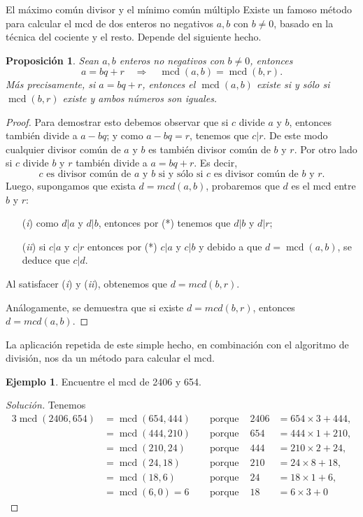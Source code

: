 \documentclass[11pt,spanish,makeidx]{amsbook}
\newtheorem{proposicion}[teorema]{Proposici\'on}
\theoremstyle{definition}
\newtheorem{ejemplo}{Ejemplo}[section]
\theoremstyle{remark}
\newcommand \mcd{\operatorname{mcd}}
\begin{document}
\begin{section}{El máximo común divisor y el mínimo común múltiplo}
Existe un famoso método para calcular el mcd de dos enteros no negativos $a,b$ con $b \not=0$, basado en la técnica del cociente y el resto. Depende del siguiente hecho.

\begin{proposicion}\label{prop-alg-eucl} Sean  $a,b$ enteros no negativos con $b \not=0$, entonces 
\begin{equation}\label{bec}
a=bq+r\quad \Rightarrow \quad\mcd(a,b)=\mcd(b,r).
\end{equation}
Más precisamente, si $a = bq + r$, entonces el $\mcd(a,b)$ existe si y sólo si  $\mcd(b,r)$ existe y ambos números son iguales.
\end{proposicion}
\begin{proof}
Para demostrar esto debemos observar que si $c$ divide $a$ y $b$, entonces también divide a $a-bq$; y como $a-bq=r$, tenemos que $c|r$. De este modo cualquier divisor común de $a$ y $b$ es también divisor común de $b$ y $r$.  Por otro lado si $c$ divide $b$ y $r$ también divide a $a=bq+r$. Es decir, 
\begin{equation}\label{eqmcd1}
\text{$c$ es divisor común de $a$ y $b$ si y sólo si $c$ es divisor común de $b$ y $r$.} \tag{*}
\end{equation}
Luego, supongamos que  exista $d = mcd(a,b)$, probaremos que $d$ es el mcd entre $b$ y $r$:
\begin{enumerate}
\item[({\em i})] como $d|a$ y $d|b$, entonces por (*) tenemos que $ d|b$ y $d|r$;
\item[({\em ii})] si $c|a $ y $c|r$ entonces por (*)  $c|a$ y $c|b$ y debido a que $d = \mcd(a,b)$, se deduce que $c|d$.
\end{enumerate}
Al satisfacer ({\em i}) y ({\em ii}), obtenemos que $d = mcd(b,r)$.

Análogamente, se demuestra que si existe $d = mcd(b,r)$, entonces  $d = mcd(a,b)$.
\end{proof}

La aplicación repetida de este simple hecho, en combinación con el algoritmo de división, nos da un método para calcular el mcd.

\begin{ejemplo} Encuentre el mcd de 2406 y 654.
\end{ejemplo}
\begin{proof}[Solución] Tenemos
\begin{alignat*}3
\mcd(2406,654)&=\mcd(654,444)& &\text{ porque }& 2406&=654\times3+444,\\
               &=\mcd(444,210)& &\text{ porque }& 654&=444\times1+210,\\
               &=\mcd(210,24)&& \text{ porque } &444&=210\times2+24,\\
               &=\mcd(24,18) && \text{ porque } &210&=24\times8+18,\\
               &=\mcd(18,6)  && \text{ porque } &24 &=18\times1+6,\\
               & =\mcd(6,0) = 6           &&\text{ porque }&18&=6\times3 + 0
\end{alignat*}


\end{proof}
\end{section}
\end{document}

